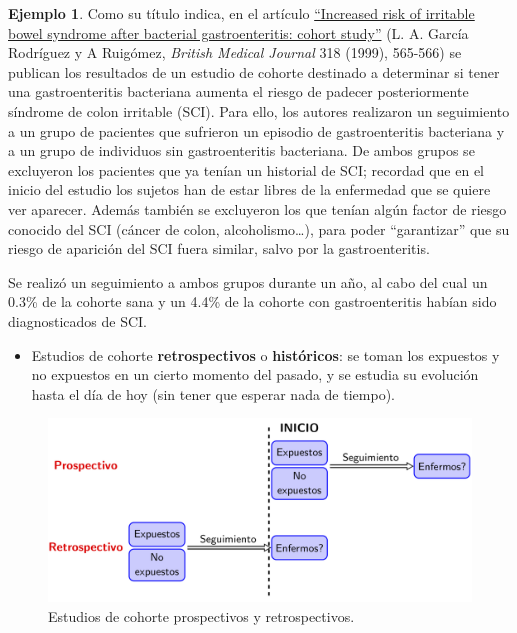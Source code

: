 \documentclass[
]{book}
\providecommand{\tightlist}{%
  \setlength{\itemsep}{0pt}\setlength{\parskip}{0pt}}
\theoremstyle{definition}
\theoremstyle{definition}
\newtheorem{example}{Ejemplo}[chapter]
\theoremstyle{definition}
\theoremstyle{definition}
\theoremstyle{remark}
\begin{document}
\begin{example}
\protect\hypertarget{exm:IBScohorte}{}\label{exm:IBScohorte}Como su título indica, en el artículo \href{https://www.ncbi.nlm.nih.gov/pmc/articles/PMC27756/}{``Increased risk of irritable bowel syndrome after bacterial gastroenteritis: cohort study''} (L. A. García Rodríguez y A Ruigómez, \emph{British Medical Journal} 318 (1999), 565-566) se publican los resultados de un estudio de cohorte destinado a determinar si tener una gastroenteritis bacteriana aumenta el riesgo de padecer posteriormente síndrome de colon irritable (SCI). Para ello, los autores realizaron un seguimiento a un grupo de pacientes que sufrieron un episodio de gastroenteritis bacteriana y a un grupo de individuos sin gastroenteritis bacteriana. De ambos grupos se excluyeron los pacientes que ya tenían un historial de SCI; recordad que en el inicio del estudio los sujetos han de estar libres de la enfermedad que se quiere ver aparecer. Además también se excluyeron los que tenían algún factor de riesgo conocido del SCI (cáncer de colon, alcoholismo\ldots), para poder ``garantizar'' que su riesgo de aparición del SCI fuera similar, salvo por la gastroenteritis.

Se realizó un seguimiento a ambos grupos durante un año, al cabo del cual un 0.3\% de la cohorte sana y un 4.4\% de la cohorte con gastroenteritis habían sido diagnosticados de SCI.
\end{example}

\begin{itemize}
\tightlist
\item
  Estudios de cohorte \textbf{retrospectivos} o \textbf{históricos}: se toman los expuestos y no expuestos en un cierto momento del pasado, y se estudia su evolución hasta el día de hoy (sin tener que esperar nada de tiempo).
\end{itemize}

\begin{figure}

{\centering \includegraphics[width=1\linewidth]{INREMDN_files/figure-html/INICIO} 

}

\caption{Estudios de cohorte prospectivos y retrospectivos.}\label{fig:INICIO}
\end{figure}
\end{document}
